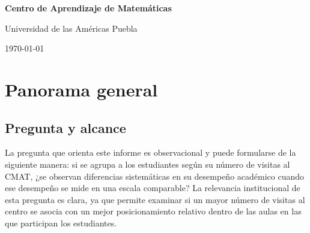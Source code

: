 \documentclass[10pt,letterpaper]{article} %
\numberwithin{figure}{subsection}
\begin{document}
\begin{titlepage}
  \centering
  \vspace*{4cm}
  {\Huge\bfseries Centro de Aprendizaje de Matemáticas\par}
  \vspace{1cm}
  {\large Universidad de las Américas Puebla\par}
  \vfill
  {\large \today\par}
\end{titlepage}

\begin{abstract}
Este documento presenta una revisión estadística de las visitas al Centro de Aprendizaje de Matemáticas (CMAT) y de su asociación con el desempeño académico. La pregunta central es si, al comparar estudiantes con distintos niveles de visitas al centro, aparecen diferencias sistemáticas en su rendimiento una vez que las calificaciones se vuelven comparables entre aulas. Para ello se trabaja con calificaciones estandarizadas por aula, es decir, con una medida que ubica a cada estudiante respecto del promedio y de la variación de su propia aula.

El reporte conserva el recorrido analítico del estudio original. Primero describe la distribución de visitas al CMAT y justifica el corte entre estudiantes con estrictamente más de 3 visitas y aquellos con 3 visitas o menos. Después examina el tratamiento de registros sin calificación final, compara estrategias de imputación y documenta la variación en los patrones de calificación entre profesores y periodos. Finalmente, presenta comparaciones por aula y por estudiante mediante pruebas paramétricas y no paramétricas, tamaños de efecto e intervalos de confianza. En todo momento, la interpretación se mantiene en un plano observacional: los resultados describen asociaciones presentes en los datos, pero no establecen por sí solos una relación causal.
\end{abstract}


\newpage
\tableofcontents
\thispagestyle{empty}
\newpage

\section{Panorama general}

\subsection{Pregunta y alcance}
La pregunta que orienta este informe es observacional y puede formularse de la siguiente manera: si se agrupa a los estudiantes según su número de visitas al CMAT, ¿se observan diferencias sistemáticas en su desempeño académico cuando ese desempeño se mide en una escala comparable? La relevancia institucional de esta pregunta es clara, ya que permite examinar si un mayor número de visitas al centro se asocia con un mejor posicionamiento relativo dentro de las aulas en las que participan los estudiantes.
\end{document}
